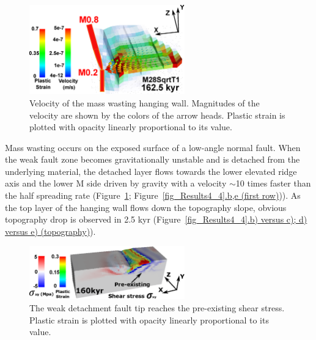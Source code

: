 \begin{figure}[h]
  \centering
    \includegraphics[width=0.6\textwidth]{./Figures/fig_Results_3_2_5_Cut-back_velocity.eps}
  \caption{Velocity of the mass wasting hanging wall. Magnitudes of the velocity are shown by the colors of the arrow heads. Plastic strain is plotted with opacity linearly proportional to its value.}
 \label{fig_Results_3_2_5_Cut-back_velocity}
\end{figure}   

Mass wasting occurs on the exposed surface of a low-angle normal fault. When the weak fault zone becomes gravitationally unstable and is detached from the underlying material, the detached layer flows towards the lower elevated ridge axis and the lower M side driven by gravity with a velocity $\sim$10 times faster than the half spreading rate (Figure~\hyperref[fig_Results_3_2_5_Cut-back_velocity]{\ref{fig_Results_3_2_5_Cut-back_velocity}}; Figure~\hyperref[fig_Results4_4]{\ref{fig_Results4_4}.b,e (first row)})). As the top layer of the hanging wall flows down the topography slope, obvious topography drop is observed in 2.5 kyr (Figure~\hyperref[fig_Results4_4]{\ref{fig_Results4_4}.b) versus c); d) versus e) (topography)}).

\begin{figure}[h]
  \centering
    \includegraphics[width=0.6\textwidth]{./Figures/fig_Results4_5_sqrt_cut_back_pre_accummulated_shear_zone.eps}
  \caption{The weak detachment fault tip reaches the pre-existing shear stress. Plastic strain is plotted with opacity linearly proportional to its value.}
 \label{fig_Results4_5}
\end{figure}   


